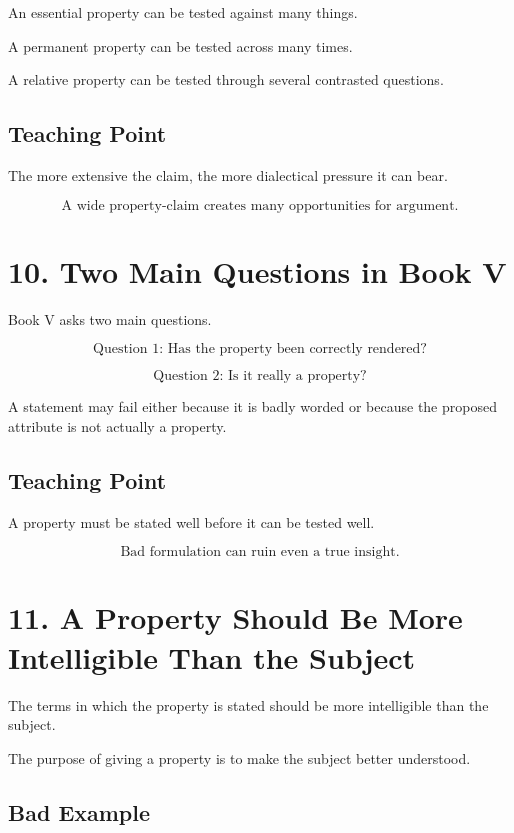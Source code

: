 \documentclass[12pt]{article}
\begin{document}
An essential property can be tested against many things.

A permanent property can be tested across many times.

A relative property can be tested through several contrasted questions.

\subsection*{Teaching Point}

The more extensive the claim, the more dialectical pressure it can bear.

\[
\boxed{
\text{A wide property-claim creates many opportunities for argument.}
}
\]

\section*{10. Two Main Questions in Book V}

Book V asks two main questions.

\[
\boxed{
\text{Question 1: Has the property been correctly rendered?}
}
\]

\[
\boxed{
\text{Question 2: Is it really a property?}
}
\]

A statement may fail either because it is badly worded or because the proposed
attribute is not actually a property.

\subsection*{Teaching Point}

A property must be stated well before it can be tested well.

\[
\boxed{
\text{Bad formulation can ruin even a true insight.}
}
\]

\section*{11. A Property Should Be More Intelligible Than the Subject}

The terms in which the property is stated should be more intelligible than the
subject.

The purpose of giving a property is to make the subject better understood.

\subsection*{Bad Example}
\end{document}
